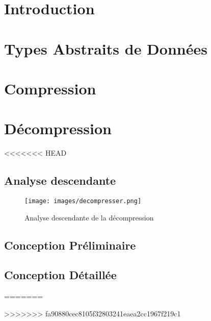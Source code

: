 \documentclass[10pt]{report}
\begin{document}
	\tableofcontents

	\chapter{Introduction} 
        
    
    \chapter{Types Abstraits de Données}
        

    \chapter{Compression}
        
    
    \chapter{Décompression}
<<<<<<< HEAD

        \section{Analyse descendante}
		\begin{figure}
   			\centering     
    		\texttt{[image: images/decompresser.png]}
    		\caption{Analyse descendante de la décompression}
    		\label{fig:exemple}
		\end{figure}
        \newpage
        \section{Conception Préliminaire}
        	
        	
        	
        	

        \newpage
        \section{Conception Détaillée}
        	
        	
        	
        	
        	
        	
=======
        
>>>>>>> fa90880cec8105f32803241eaea2cc1967f219c1
\end{document}
